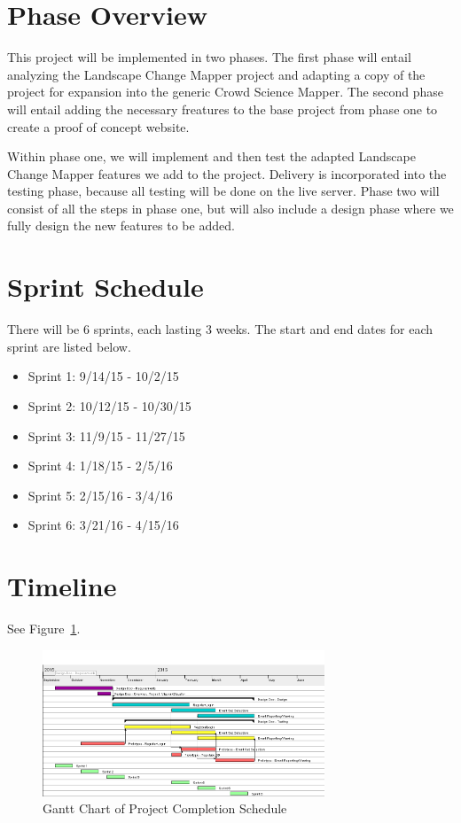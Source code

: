 \section{Phase  Overview}
This project will be implemented in two phases. The first phase will entail analyzing the Landscape Change Mapper project and adapting a copy of the project for expansion into the generic Crowd Science Mapper. The  second phase will entail adding the necessary freatures to the base project from phase one to create a proof of concept website.

Within phase one, we will implement and then test the adapted Landscape Change Mapper features we add to the project. Delivery is incorporated into the testing phase, because all testing will be done on the live server. Phase two will consist of all the steps in phase one, but will also include a design phase where we fully design the new features to be added.

\section{Sprint Schedule}
There will be 6 sprints, each lasting 3 weeks. The start and end dates for each sprint are listed below.
\begin{itemize}
\itemsep0em
\item Sprint 1: 9/14/15 - 10/2/15
\item Sprint 2: 10/12/15 - 10/30/15
\item Sprint 3: 11/9/15 - 11/27/15
\item Sprint 4: 1/18/15 - 2/5/16
\item Sprint 5: 2/15/16 - 3/4/16
\item Sprint 6: 3/21/16 - 4/15/16
\end{itemize}

\section{Timeline}
See Figure~\ref{projectgantt}.

\begin{figure}[tbh]
\begin{center}
\includegraphics[width=0.75\textwidth]{./figures/projectgantt.png}
\end{center}
\caption{Gantt Chart of Project Completion Schedule\label{projectgantt}}
\end{figure}

